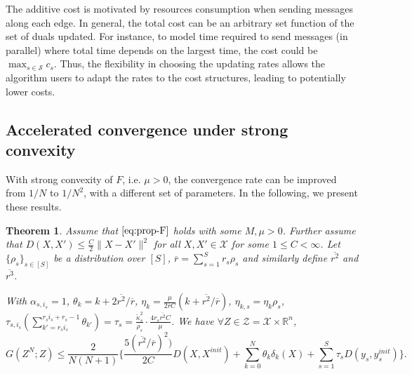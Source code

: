 \documentclass[10pt]{article}
\newcommand{\mc}{\mathcal}
\newcommand{\R}{\mathbb{R}}
\newtheorem{theorem}{Theorem}[section]
\begin{document}
The additive cost is motivated by resources consumption when sending messages along each edge. In general, the total cost can be an arbitrary set function of the set of duals updated. For instance, to model time required to send messages (in parallel) where total time depends on the largest time, the cost could be $\max_{s\in \mc S}c_s$. Thus, the flexibility in choosing the updating rates allows the algorithm users to adapt the rates to the cost structures, leading to potentially lower costs.   





\subsection{Accelerated convergence under strong convexity}\label{sec:convergence-acc}
With strong convexity of $F$, i.e. $\mu>0$, the convergence rate can be improved from $1/N$ to $1/N^2$, with a different set of parameters. In the following, we present these results.





\begin{theorem}\label{thm:acc_convergence}
Assume that $\eqref{eq:prop-F}$ holds with some $M,\mu>0$. Further assume that $D(X,X')\leq \frac{C}{2}\|X-X'\|^2$ for all $X,X'\in \mc X$ for some $1\leq C<\infty$. Let $\{\rho_s\}_{s\in [S]}$ be a distribution over $[S]$, $\overline{r} = \sum_{s=1}^S r_s\rho_s$ and similarly define $\overline{r^2}$ and $\overline{r^3}$. 
    
    With $\alpha_{s,i_s} = 1$, $\theta_k = k+ 2\overline{r^2}/\overline{r}$, $\eta_k = \frac{\mu }{2\overline{r}C}(k+\overline{r^2}/\overline{r})$, $\eta_{k,s} = \eta_k\rho_s$, $\tau_{s,i_s}(\sum_{k'=r_si_s}^{r_si_s+r_s-1}\theta_{k'}) = \tau_s= \frac{\widetilde{\kappa}_s^2}{\rho_s}\cdot\frac{4r_s\overline{r^2}C}{\mu}$. We have $\forall Z\in \mc Z=\mc X\times \R^n$, 
\begin{equation*}
     G(Z^N;Z) \leq \frac{2}{N(N+1)}\biggl\{\frac{5(\overline{r^2}/\overline{r})^2)}{2C}D(X,X^{init})+\sum_{k=0}^N\theta_k\delta_k(X)+ \sum_{s=1}^S\tau_{s}D(y_s,y_s^{init})  \biggr\}.
\end{equation*}


\end{theorem}
\end{document}

